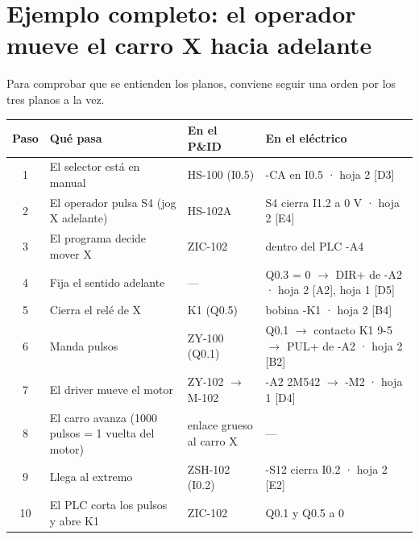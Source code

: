 \documentclass[11pt]{article}
\newcommand{\zona}[1]{\textsf{\small[#1]}}
\begin{document}
\section{Ejemplo completo: el operador mueve el carro X hacia adelante}
Para comprobar que se entienden los planos, conviene seguir una orden por los tres planos a la vez.

\begin{center}\small
\begin{tabularx}{\linewidth}{c >{\raggedright}X >{\raggedright}p{3.2cm} >{\raggedright\arraybackslash}p{3.4cm}}
\toprule \textbf{Paso} & \textbf{Qué pasa} & \textbf{En el P\&ID} & \textbf{En el eléctrico}\\ \midrule
1 & El selector está en manual & HS-100 (I0.5) & -CA en I0.5 · hoja 2 \zona{D3}\\
2 & El operador pulsa S4 (jog X adelante) & HS-102A & S4 cierra I1.2 a 0 V · hoja 2 \zona{E4}\\
3 & El programa decide mover X & ZIC-102 & dentro del PLC -A4\\
4 & Fija el sentido adelante & — & Q0.3 = 0 $\rightarrow$ DIR+ de -A2 · hoja 2 \zona{A2}, hoja 1 \zona{D5}\\
5 & Cierra el relé de X & K1 (Q0.5) & bobina -K1 · hoja 2 \zona{B4}\\
6 & Manda pulsos & ZY-100 (Q0.1) & Q0.1 $\rightarrow$ contacto K1 9-5 $\rightarrow$ PUL+ de -A2 · hoja 2 \zona{B2}\\
7 & El driver mueve el motor & ZY-102 $\rightarrow$ M-102 & -A2 2M542 $\rightarrow$ -M2 · hoja 1 \zona{D4}\\
8 & El carro avanza (1000 pulsos = 1 vuelta del motor) & enlace grueso al carro X & —\\
9 & Llega al extremo & ZSH-102 (I0.2) & -S12 cierra I0.2 · hoja 2 \zona{E2}\\
10 & El PLC corta los pulsos y abre K1 & ZIC-102 & Q0.1 y Q0.5 a 0\\
\bottomrule\end{tabularx}\end{center}

\end{document}
